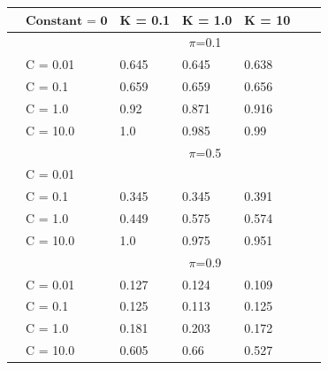 \documentclass[english]{report}
\begin{document}
\begin{table}[H]
    \centering
    
    \begin{tabular}{ll|lllll}
        \hline
                                & $\textbf{Constant = 0}$  &         K = 0.1 & K = 1.0 & K = 10 \\ \hline
                                & & \multicolumn{3}{c}{$\pi$=0.1} \\ \hline
                                & C = 0.01   & 0.645 & 0.645 & 0.638    \\
                                & C = 0.1    & 0.659 & 0.659 & 0.656  \\
                                & C = 1.0    & 0.92 & 0.871 & 0.916    \\
                                & C = 10.0   & 1.0 & 0.985 & 0.99  \\ \hline

                                & & \multicolumn{3}{c}{$\pi$=0.5} \\ \hline
                                & C = 0.01   & \color{red}{0.33} & \color{red}{0.344} & \color{red}{0.354}   \\
                                & C = 0.1    & 0.345 & 0.345 & 0.391  \\
                                & C = 1.0    & 0.449 & 0.575 & 0.574    \\
                                & C = 10.0   & 1.0 & 0.975 & 0.951  \\ \hline

                                & & \multicolumn{3}{c}{$\pi$=0.9} \\ \hline
                                & C = 0.01   & 0.127 & 0.124 & 0.109  \\
                                & C = 0.1    & 0.125 & 0.113 & 0.125  \\
                                & C = 1.0    & 0.181 & 0.203 & 0.172    \\
                                & C = 10.0   & 0.605 & 0.66 & 0.527  \\ 
    \hline
    \end{tabular}
\end{table}
\end{document}

